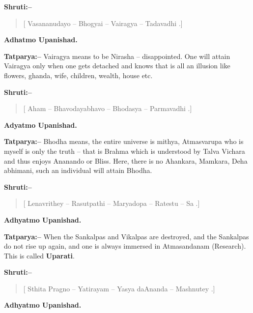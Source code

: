 \textbf{Shruti:–}

\begin{verse}
[ Vasananudayo – Bhogyai – Vairagya – Tadavadhi .]
\end{verse}

\begin{flushright}
\textbf{Adhatmo Upanishad.}
\end{flushright}

\textbf{Tatparya:–} Vairagya means to be Nirasha – disappointed. One will attain Vairagya only when one gets detached and knows that is all an illusion like flowers, ghanda, wife, children, wealth, house etc.

\textbf{Shruti:–}

\begin{verse}
[ Aham – Bhavodayabhavo – Bhodasya – Parmavadhi .]
\end{verse}

\begin{flushright}
\textbf{Adyatmo Upanishad.}
\end{flushright}

\textbf{Tatparya:–} Bhodha means, the entire universe is mithya, Atmasvarupa who is myself is only the truth – that is Brahma which is understood by Talva Vichara and thus enjoys Ananando or Bliss. Here, there is no Ahankara, Mamkara, Deha abhimani, such an individual will attain Bhodha.

\textbf{Shruti:–}

\begin{verse}
[ Lenavrithey – Rasutpathi – Maryadopa – Ratestu – Sa .]
\end{verse}

\begin{flushright}
\textbf{Adhyatmo Upanishad.}
\end{flushright}

\textbf{Tatparya:–} When the Sankalpas and Vikalpas are destroyed, and the Sankalpas do not rise up again, and one is always immersed in Atmasandanam (Research). This is called \textbf{Uparati}.

\textbf{Shruti:–}

\begin{verse}
[ Sthita Pragno – Yatirayam – Yasya daAnanda – Mashnutey .]
\end{verse}

\begin{flushright}
\textbf{Adhyatmo Upanishad.}
\end{flushright}

